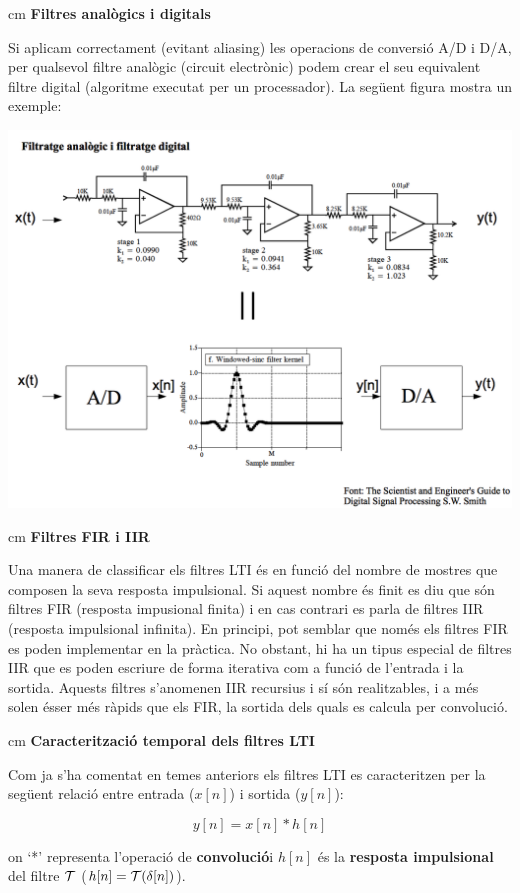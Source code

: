 \documentclass{article}
\begin{document}
 cm
\textbf{Filtres analògics i digitals}

Si aplicam correctament (evitant aliasing) les operacions de conversió A/D i D/A, per qualsevol filtre analògic (circuit electrònic)
podem crear el seu equivalent filtre digital (algoritme executat per un processador). La següent figura mostra un exemple:

\includegraphics[width=15cm]{analogicvsdigital.png}

 cm
\textbf{Filtres FIR i IIR}

Una manera de classificar els filtres LTI és en funció del nombre de mostres que composen la seva resposta impulsional.
Si aquest nombre és finit es diu que són filtres FIR (resposta impusional finita) i en cas contrari es parla de filtres IIR
(resposta impulsional infinita). En principi, pot semblar que només els filtres FIR es poden implementar en la pràctica.
No obstant, hi ha un tipus especial de filtres IIR que es poden escriure de forma iterativa com a funció de l'entrada
i la sortida. Aquests filtres s'anomenen IIR recursius i sí són realitzables, i a més solen ésser més ràpids que els FIR, 
la sortida dels quals es calcula per convolució.


 cm
\noindent
\textbf{\large Caracterització temporal dels filtres LTI}

Com ja s'ha comentat en temes anteriors els filtres LTI es caracteritzen per la següent relació entre entrada ($x[n]$) i sortida ($y[n]$):

\[
y[n]=x[n] * h[n]
\]

on `*' representa l'operació de \textbf{convolució}i $h[n]$ és la \textbf{resposta impulsional} del filtre ${\cal T}$ ($h[n]={\cal T}(\delta [n])$).
\end{document}

